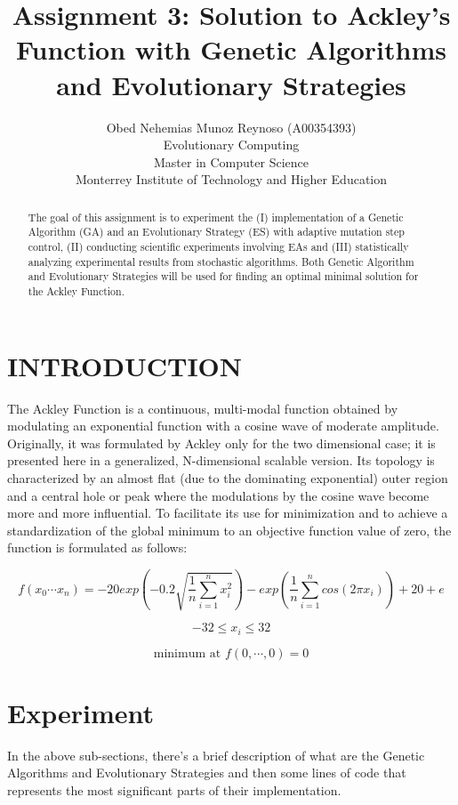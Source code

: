 \documentclass[]{spie}  %
\title{Assignment 3:  Solution to Ackley’s Function with Genetic Algorithms and Evolutionary Strategies}
\author{Obed Nehemias Munoz Reynoso (A00354393)
	\\Evolutionary Computing
    \\Master in Computer Science
    \\Monterrey Institute of Technology and Higher Education
}
\begin{document}
 
\maketitle

\begin{abstract}
The goal of this assignment is to experiment the (I) implementation of a Genetic Algorithm
(GA) and an Evolutionary Strategy (ES) with adaptive mutation step control, (II) conducting scientific
experiments involving EAs and (III) statistically analyzing experimental results from stochastic algorithms. Both Genetic Algorithm and Evolutionary Strategies will be used for finding an optimal minimal solution for the Ackley Function.
\end{abstract}


\section{INTRODUCTION}
\label{sec:intro}  %

The Ackley Function is a continuous, multi-modal function obtained by modulating an exponential function
with a cosine wave of moderate amplitude. Originally, it was formulated by Ackley only for the two dimensional case; it is presented here in a generalized, N-dimensional scalable version. Its topology is characterized by an almost flat (due to the dominating exponential) outer region and a central hole or peak where the modulations by the cosine wave become more and more influential. To facilitate its use for minimization and to achieve a standardization of the global minimum to an objective function value of zero, the function is formulated as follows:

$$f(x_0 \cdots x_n) = -20 exp(-0.2 \sqrt{\frac{1}{n} \sum_{i=1}^n x_i^2}) - exp(\frac{1}{n} \sum_{i=1}^n cos(2\pi x_i)) + 20 + e$$ 

$$-32 \leq x_i \leq 32$$ 

$$\text{minimum at }f(0, \cdots, 0) = 0$$

\section{Experiment}
In the above sub-sections, there's a brief description of what are the Genetic Algorithms and Evolutionary Strategies and then some lines of code that represents the most significant parts of their implementation. 
\end{document}
